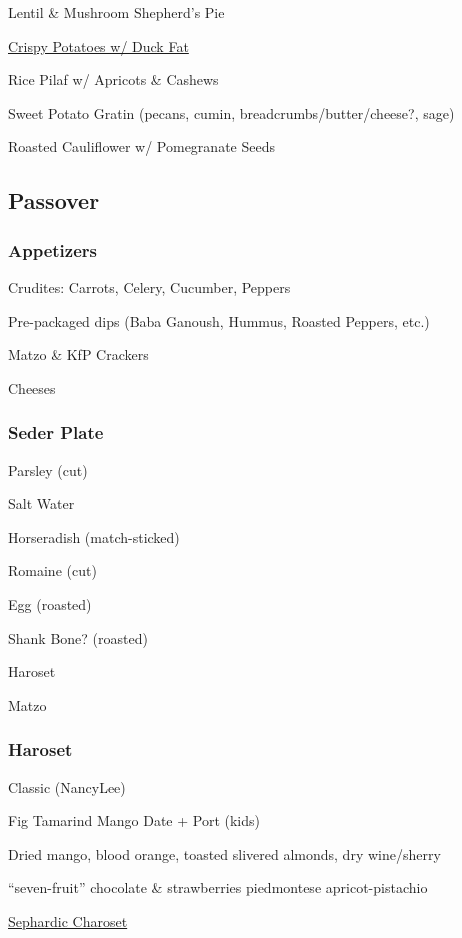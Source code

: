 \begin{centering}
 Lentil \& Mushroom Shepherd's Pie

 \href{http://www.seriouseats.com/recipes/2011/11/ultra-crispy-roast-potatoes-recipe.html}{Crispy Potatoes w/ Duck Fat}

 Rice Pilaf w/ Apricots \& Cashews

 Sweet Potato Gratin (pecans, cumin, breadcrumbs/butter/cheese?, sage)

 Roasted Cauliflower w/ Pomegranate Seeds

 \subsection*{Passover}

 \subsubsection*{Appetizers}
 Crudites: Carrots, Celery, Cucumber, Peppers

 Pre-packaged dips (Baba Ganoush, Hummus, Roasted Peppers, etc.)

 Matzo \& KfP Crackers

 Cheeses

 \subsubsection*{Seder Plate}
 Parsley (cut)

 Salt Water

 Horseradish (match-sticked)

 Romaine (cut)

 Egg (roasted)

 Shank Bone? (roasted)

 Haroset

 Matzo

 \subsubsection*{Haroset}
 Classic (NancyLee)

 Fig \blt Tamarind \blt Mango \blt Date + Port (kids)

 Dried mango, blood orange, toasted slivered almonds, dry wine/sherry

 “seven-fruit” \blt chocolate \& strawberries \blt piedmontese \blt apricot-pistachio

 \href{https://www.seriouseats.com/2012/04/how-to-make-sephardic-charoset-haroset-dried-fruit-recipe-passover.html}{Sephardic Charoset}


\end{centering}

